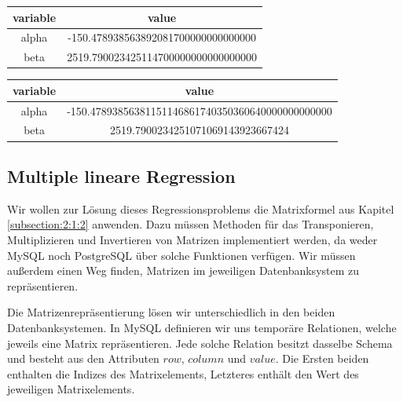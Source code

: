 \begin{center}
  \begin{tabular}{|c|c|}\hline
    \textbf{variable} & \textbf{value} \\ \hline
    alpha & -150.478938563892081700000000000000 \\ \hline
    beta & 2519.790023425114700000000000000000 \\ \hline
  \end{tabular}

  \begin{tabular}{|c|c|}\hline
    \textbf{variable} & \textbf{value} \\ \hline
    alpha & -150.47893856381151146861740350360640000000000000 \\ \hline
    beta & 2519.7900234251071069143923667424 \\ \hline
  \end{tabular}
\end{center}

\subsection{Multiple lineare Regression}
\label{subsection:3:4:2}

Wir wollen zur Lösung dieses Regressionsproblems die Matrixformel aus Kapitel \ref{subsection:2:1:2} anwenden. Dazu müssen Methoden für das Transponieren, Multiplizieren und Invertieren von Matrizen implementiert werden, da weder MySQL noch PostgreSQL über solche Funktionen verfügen. Wir müssen außerdem einen Weg finden, Matrizen im jeweiligen Datenbanksystem zu repräsentieren.

Die Matrizenrepräsentierung lösen wir unterschiedlich in den beiden Datenbanksystemen. In MySQL definieren wir uns temporäre Relationen, welche jeweils eine Matrix repräsentieren. Jede solche Relation besitzt dasselbe Schema und besteht aus den Attributen $row$, $column$ und $value$. Die Ersten beiden enthalten die Indizes des Matrixelements, Letzteres enthält den Wert des jeweiligen Matrixelements.

